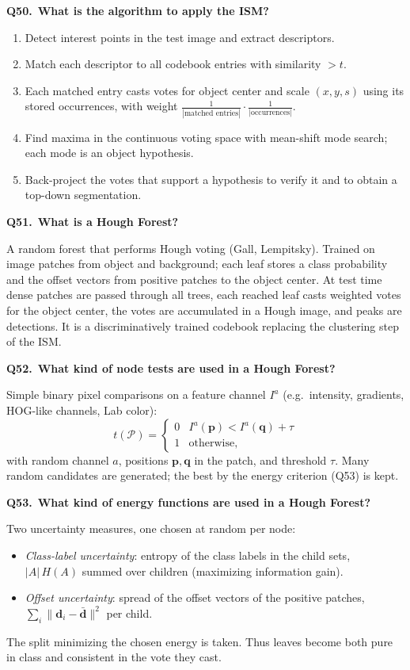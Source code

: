 \documentclass[11pt,a4paper]{article}
\newcommand{\keep}[1]{\par
  \ifdim\dimexpr\pagegoal-\pagetotal\relax<#1\relax\newpage\fi}
\newcommand{\q}[2]{\keep{2.5cm}\medskip
  {\sffamily\bfseries\color{questc}Q#1.}\ {\sffamily\bfseries #2}\par}
\begin{document}
\q{50}{What is the algorithm to apply the ISM?}
\begin{enumerate}
  \item Detect interest points in the test image and extract descriptors.
  \item Match each descriptor to all codebook entries with similarity $> t$.
  \item Each matched entry casts votes for object center and scale
    $(x,y,s)$ using its stored occurrences, with weight
    $\frac{1}{|\text{matched entries}|}\cdot\frac{1}{|\text{occurrences}|}$.
  \item Find maxima in the continuous voting space with mean-shift mode
    search; each mode is an object hypothesis.
  \item Back-project the votes that support a hypothesis to verify it and to
    obtain a top-down segmentation.
\end{enumerate}

\q{51}{What is a Hough Forest?}
A random forest that performs Hough voting (Gall, Lempitsky). Trained on
image patches from object and background; each leaf stores a class probability
and the offset vectors from positive patches to the object center. At test time
dense patches are passed through all trees, each reached leaf casts weighted
votes for the object center, the votes are accumulated in a Hough image, and
peaks are detections. It is a discriminatively trained codebook replacing the
clustering step of the ISM.

\q{52}{What kind of node tests are used in a Hough Forest?}
Simple binary pixel comparisons on a feature channel $I^a$ (e.g.\ intensity,
gradients, HOG-like channels, Lab color):
\[
  t(\mathcal{P}) = \begin{cases}
    0 & I^a(\mathbf{p}) < I^a(\mathbf{q}) + \tau\\ 1 & \text{otherwise,}
  \end{cases}
\]
\noindent
with random channel $a$, positions $\mathbf{p},\mathbf{q}$ in the patch, and
threshold $\tau$. Many random candidates are generated; the best by the
energy criterion (Q53) is kept.

\q{53}{What kind of energy functions are used in a Hough Forest?}
Two uncertainty measures, one chosen at random per node:
\begin{itemize}
  \item \emph{Class-label uncertainty}: entropy of the class labels in the
    child sets, $|A|\,H(A)$ summed over children (maximizing information gain).
  \item \emph{Offset uncertainty}: spread of the offset vectors of the positive
    patches, $\sum_{i}\|\mathbf{d}_i - \bar{\mathbf{d}}\|^2$ per child.
\end{itemize}
\noindent
The split minimizing the chosen energy is taken. Thus leaves become both pure in
class and consistent in the vote they cast.
\end{document}
